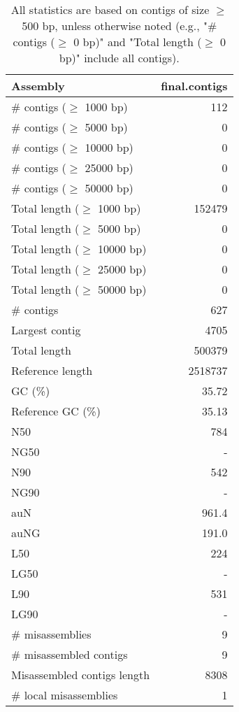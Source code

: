 \documentclass[12pt,a4paper]{article}
\begin{document}
\begin{table}[ht]
\begin{center}
\caption{All statistics are based on contigs of size $\geq$ 500 bp, unless otherwise noted (e.g., "\# contigs ($\geq$ 0 bp)" and "Total length ($\geq$ 0 bp)" include all contigs).}
\begin{tabular}{|l*{1}{|r}|}
\hline
Assembly & final.contigs \\ \hline
\# contigs ($\geq$ 1000 bp) & 112 \\ \hline
\# contigs ($\geq$ 5000 bp) & 0 \\ \hline
\# contigs ($\geq$ 10000 bp) & 0 \\ \hline
\# contigs ($\geq$ 25000 bp) & 0 \\ \hline
\# contigs ($\geq$ 50000 bp) & 0 \\ \hline
Total length ($\geq$ 1000 bp) & 152479 \\ \hline
Total length ($\geq$ 5000 bp) & 0 \\ \hline
Total length ($\geq$ 10000 bp) & 0 \\ \hline
Total length ($\geq$ 25000 bp) & 0 \\ \hline
Total length ($\geq$ 50000 bp) & 0 \\ \hline
\# contigs & 627 \\ \hline
Largest contig & 4705 \\ \hline
Total length & 500379 \\ \hline
Reference length & 2518737 \\ \hline
GC (\%) & 35.72 \\ \hline
Reference GC (\%) & 35.13 \\ \hline
N50 & 784 \\ \hline
NG50 & - \\ \hline
N90 & 542 \\ \hline
NG90 & - \\ \hline
auN & 961.4 \\ \hline
auNG & 191.0 \\ \hline
L50 & 224 \\ \hline
LG50 & - \\ \hline
L90 & 531 \\ \hline
LG90 & - \\ \hline
\# misassemblies & 9 \\ \hline
\# misassembled contigs & 9 \\ \hline
Misassembled contigs length & 8308 \\ \hline
\# local misassemblies & 1 \\ \hline

\end{tabular}
\end{center}
\end{table}
\end{document}
